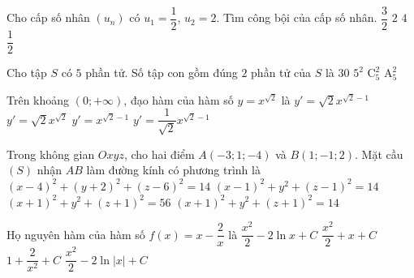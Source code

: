 \begin{ex}%
	Cho cấp số nhân $\left(u_n\right)$ có $u_1=\dfrac{1}{2}$, $u_2=2$. Tìm công bội của cấp số nhân.
	\choice
	{$\dfrac{3}{2}$}
	{$2$}
	{\True $4$}
	{$\dfrac{1}{2}$}
\end{ex}

\begin{ex}%
	Cho tập $S$ có $5$ phần tử. Số tập con gồm đúng $2$ phần tử của $S$ là
	\choice
	{$30$}
	{$5^2$}
	{\True $\mathrm{C}_5^2$}
	{$\mathrm{A}_5^2$}
\end{ex}

\begin{ex}%
	Trên khoảng $(0;+\infty)$, đạo hàm của hàm số $y=x^{\sqrt{2}}$ là
	\choice
	{\True $y'=\sqrt{2}x^{\sqrt{2}-1}$}
	{$y'=\sqrt{2}x^{\sqrt{2}}$}
	{$y'=x^{\sqrt{2}-1}$}
	{$y'=\dfrac{1}{\sqrt{2}}x^{\sqrt{2}-1}$}
\end{ex}

\begin{ex}%
	Trong không gian $Oxyz$, cho hai điểm $A\left(-3;1;-4\right)$ và $B\left(1;-1;2\right)$. Mặt cầu $(S)$ nhận $AB$ làm đường kính có phương trình là
	\choice
	{$\left(x-4\right)^2+\left(y+2\right)^2+\left(z-6\right)^2=14$}
	{$\left(x-1\right)^2+y^2+\left(z-1\right)^2=14$}
	{$\left(x+1\right)^2+y^2+\left(z+1\right)^2=56$}
	{\True $\left(x+1\right)^2+y^2+\left(z+1\right)^2=14$}
\end{ex}

\begin{ex}%
	Họ nguyên hàm của hàm số $f(x)=x-\dfrac{2}{x}$ là
	\choice
	{$\dfrac{x^2}{2}-2\ln x+C$}
	{$\dfrac{x^2}{2}+x+C$}
	{$1+\dfrac{2}{x^2}+C$}
	{\True $\dfrac{x^2}{2}-2\ln \left|x\right|+C$}
\end{ex}

